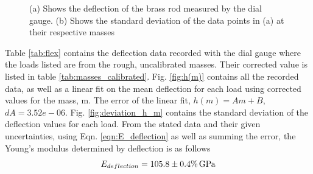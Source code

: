 \documentclass[11pt,a4paper]{article}
\begin{document}
   
    \begin{figure}[H]
      \centering
      \center
      \caption{(a) Shows the deflection of the brass rod measured by the dial gauge. (b) Shows the standard deviation of the data points in (a) at their respective masses}
      \label{fig:exp_1}
    \end{figure}

  Table \ref{tab:flex} contains the deflection data recorded with the dial gauge where the loads listed are from the rough, uncalibrated masses. Their corrected value is listed in table \ref{tab:masses_calibrated}. 
  \newline
  \newline
  Fig. \ref{fig:h(m)} contains all the recorded data, as well as a linear fit on the mean deflection for each load using corrected values for the mass, m. The error of the linear fit, $h(m) = Am + B$, $dA = 3.52e-06$. Fig. \ref{fig:deviation_h_m} contains the standard deviation of the deflection values for each load.
  \newline
  \newline
  From the stated data and their given uncertainties, using Eqn. \ref{eqn:E_deflection} as well as summing the error, the Young's modulus determined by deflection is as follows
  \begin{equation}
    E_{deflection} = 105.8 \pm 0.4\% \, \textup{G}\textup{Pa}
  \end{equation}
\end{document}
